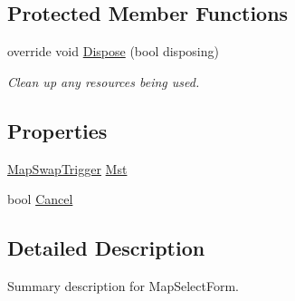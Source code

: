 \subsection*{Protected Member Functions}
\begin{DoxyCompactItemize}
\item 
override void \hyperlink{class_p_a_z___dispersal_1_1frm_map_select_form_a669ede639fb12bba0c66fc59efd86a8f}{Dispose} (bool disposing)
\begin{DoxyCompactList}\small\item\em Clean up any resources being used. \end{DoxyCompactList}\end{DoxyCompactItemize}
\subsection*{Properties}
\begin{DoxyCompactItemize}
\item 
\hyperlink{class_p_a_z___dispersal_1_1_map_swap_trigger}{Map\-Swap\-Trigger} \hyperlink{class_p_a_z___dispersal_1_1frm_map_select_form_ae8f312c83543b33039bba554d1bba5d6}{Mst}
\item 
bool \hyperlink{class_p_a_z___dispersal_1_1frm_map_select_form_ab0de9445932eb18d83175b8b478a69a0}{Cancel}
\end{DoxyCompactItemize}


\subsection{Detailed Description}
Summary description for Map\-Select\-Form. 



